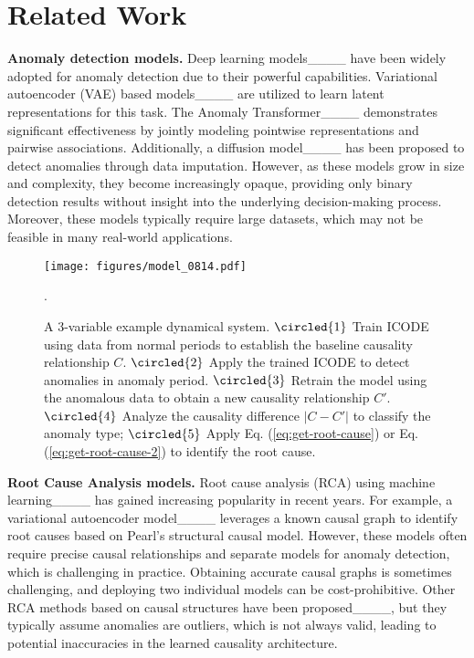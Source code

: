 \section{Related Work}
\textbf{Anomaly detection models.}
Deep learning models____ have been widely adopted for anomaly detection due to their powerful capabilities. 
Variational autoencoder (VAE) based models____ are utilized to learn latent representations for this task. 
The Anomaly Transformer____ demonstrates significant effectiveness by jointly modeling pointwise representations and pairwise associations. 
Additionally, a diffusion model____ has been proposed to detect anomalies through data imputation. 
However, as these models grow in size and complexity, they become increasingly opaque, providing only binary detection results without insight into the underlying decision-making process. 
Moreover, these models typically require large datasets, which may not be feasible in many real-world applications.

\begin{figure*}
\centering
\texttt{[image: figures/model\_0814.pdf]} 
\caption{A 3-variable example dynamical system. 
$\protect\circled{1}$ Train ICODE using data from normal periods to establish the baseline causality relationship $C$.
$\protect\circled{2}$ Apply the trained ICODE to detect anomalies in anomaly period.
$\protect\circled{3}$ Retrain the model using the anomalous data to obtain a new causality relationship $C'$.
$\protect\circled{4}$ Analyze the causality difference $|C-C'|$ to classify the anomaly type; $\protect\circled{5}$ Apply Eq. (\ref{eq:get-root-cause}) or Eq. (\ref{eq:get-root-cause-2}) to identify the root cause.
}.

\label{fig:architecture}
\vspace{-0.27in}
\end{figure*}


\textbf{Root Cause Analysis models.}
Root cause analysis (RCA) using machine learning____ has gained increasing popularity in recent years. 
For example, a variational autoencoder model____ leverages a known causal graph to identify root causes based on Pearl's structural causal model. 
However, these models often require precise causal relationships and separate models for anomaly detection, which is challenging in practice. 
Obtaining accurate causal graphs is sometimes challenging, and deploying two individual models can be cost-prohibitive. 
Other RCA methods based on causal structures have been proposed____, but they typically assume anomalies are outliers, 
which is not always valid, leading to potential inaccuracies in the learned causality architecture.

